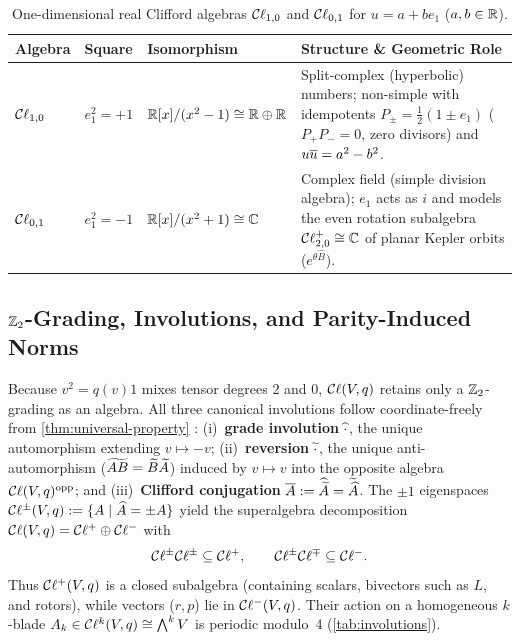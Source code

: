 \documentclass[11pt,a4paper]{article}
\begin{document}
\begin{table}[htbp]
  \centering
  \caption{One-dimensional real Clifford algebras $\mathcal{C}\ell_{1,0}$ and $\mathcal{C}\ell_{0,1}$
    for $u = a + b e_1$ ($a, b \in \mathbb{R}$).}
  \label{tab:low-dim}
  \small
  \renewcommand{\arraystretch}{1.16}
  \begin{tabularx}{\textwidth}{@{} >{\bfseries}l l l >{\raggedright\arraybackslash}X @{}}
    \toprule
    \textbf{Algebra} & \textbf{Square} & \textbf{Isomorphism} &
      \textbf{Structure \& Geometric Role} \\
    \midrule
    $\mathcal{C}\ell_{1,0}$ & $e_1^2 = +1$ &
      $\mathbb{R}[x]/(x^2 - 1) \cong \mathbb{R} \oplus \mathbb{R}$ &
      Split-complex (hyperbolic) numbers; non-simple with idempotents
      $P_\pm = \tfrac{1}{2}(1 \pm e_1)$ ($P_+ P_- = 0$, zero divisors) and
      $u\overline{u} = a^2 - b^2$. \\
    $\mathcal{C}\ell_{0,1}$ & $e_1^2 = -1$ &
      $\mathbb{R}[x]/(x^2 + 1) \cong \mathbb{C}$ &
      Complex field (simple division algebra); $e_1$ acts as $i$ and models the
      even rotation subalgebra $\mathcal{C}\ell^+_{2,0} \cong \mathbb{C}$ of planar Kepler orbits
      ($e^{\theta \hat{B}}$). \\
    \bottomrule
  \end{tabularx}
\end{table}

\subsection{\texorpdfstring{$\mathbb{Z}_2$}{Z2}-Grading, Involutions, and Parity-Induced Norms}
\label{subsec:grading-involutions-norm}

Because $v^2 = q(v) 1$ mixes tensor degrees $2$ and $0$, $\mathcal{C}\ell(V, q)$ retains
only a $\mathbb{Z}_2$-grading as an algebra.
All three canonical involutions follow coordinate-freely from
\cref{thm:universal-property}
\cite[Sec.~5.3]{garlingCliffordAlgebrasIntroduction2011}:
(i)~\textbf{grade involution} $\widehat{\cdot}$, the unique automorphism extending
$v \mapsto -v$;
(ii)~\textbf{reversion} $\widetilde{\cdot}$, the unique anti-automorphism
($\widetilde{AB} = \widetilde{B}\widetilde{A}$) induced by $v \mapsto v$ into the opposite
algebra $\mathcal{C}\ell(V,q)^{\mathrm{opp}}$; and
(iii)~\textbf{Clifford conjugation} $\overline{A} := \widehat{\widetilde{A}} =
\widetilde{\widehat{A}}$.
The $\pm 1$ eigenspaces $\mathcal{C}\ell^\pm(V, q) := \{ A \mid \widehat{A} = \pm A \}$ yield
the superalgebra decomposition $\mathcal{C}\ell(V, q) = \mathcal{C}\ell^+ \oplus \mathcal{C}\ell^-$ with
\begin{equation}
  \label{eq:z2-grading}
  \mathcal{C}\ell^\pm \mathcal{C}\ell^\pm \subseteq \mathcal{C}\ell^+, \qquad
  \mathcal{C}\ell^\pm \mathcal{C}\ell^\mp \subseteq \mathcal{C}\ell^-.
\end{equation}
Thus $\mathcal{C}\ell^+(V, q)$ is a closed subalgebra (containing scalars, bivectors such
as $L$, and rotors), while vectors ($r, p$) lie in $\mathcal{C}\ell^-(V, q)$.
Their action on a homogeneous $k$-blade $A_k \in \mathcal{C}\ell^k(V, q) \cong
\bigwedge^k V$ is periodic modulo~$4$ (\cref{tab:involutions}).
\end{document}
